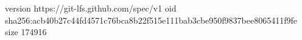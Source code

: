 version https://git-lfs.github.com/spec/v1
oid sha256:acb40b27c44fd4571c76bca8b22f515e111bab3cbe950f9837bee8065411f9fe
size 174916
